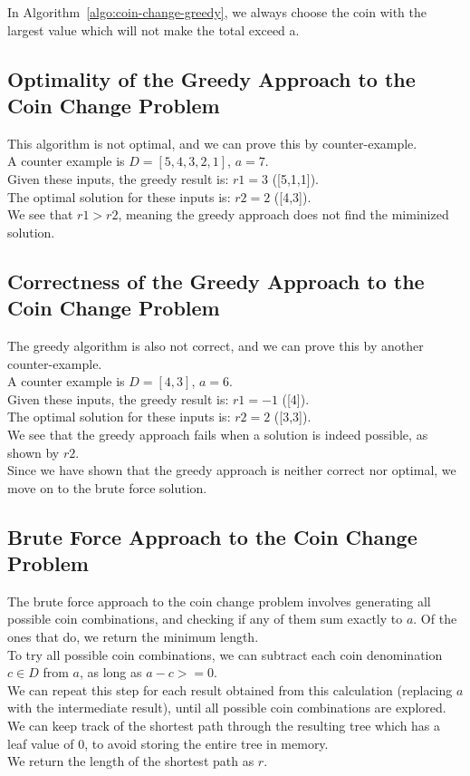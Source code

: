 In Algorithm~\ref{algo:coin-change-greedy}, we always choose the coin with the largest value which will not make the total exceed a.

\subsection{Optimality of the Greedy Approach to the Coin Change Problem}

This algorithm is not optimal, and we can prove this by counter-example.\\
A counter example is $D = [5,4,3,2,1]$, $a = 7$.\\
Given these inputs, the greedy result is: $r1 = 3$  ([5,1,1]).\\
The optimal solution for these inputs is: $r2 = 2$ ([4,3]).\\
We see that $r1 > r2$, meaning the greedy approach does not find the miminized solution.\\

\subsection{Correctness of the Greedy Approach to the Coin Change Problem}

The greedy algorithm is also not correct, and we can prove this by another counter-example.\\
A counter example is $D = [4,3]$, $a = 6$.\\
Given these inputs, the greedy result is: $r1 = -1$  ([4]).\\
The optimal solution for these inputs is: $r2 = 2$ ([3,3]).\\
We see that the greedy approach fails when a solution is indeed possible, as shown by $r2$.\\
Since we have shown that the greedy approach is neither correct nor optimal, we move on to the brute force solution.\\


\subsection{Brute Force Approach to the Coin Change Problem}

The brute force approach to the coin change problem involves generating all possible coin combinations, and checking if any of them sum exactly to $a$.
Of the ones that do, we return the minimum length.\\
To try all possible coin combinations, we can subtract each coin denomination $c \in D$ from $a$, as long as $a - c >= 0$.\\
We can repeat this step for each result obtained from this calculation (replacing $a$ with the intermediate result), until all possible coin combinations are explored.\\
We can keep track of the shortest path through the resulting tree which has a leaf value of 0, to avoid storing the entire tree in memory.\\
We return the length of the shortest path as $r$.\\


